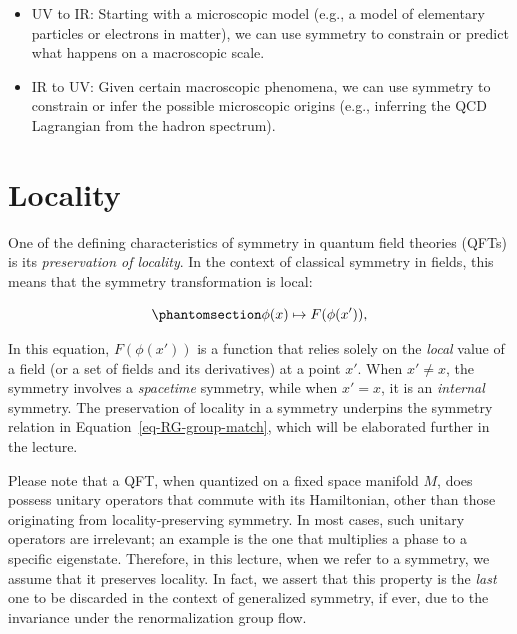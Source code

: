 \documentclass[
  letterpaper,
  DIV=11,
  numbers=noendperiod]{scrreport}
\providecommand{\tightlist}{%
  \setlength{\itemsep}{0pt}\setlength{\parskip}{0pt}}\usepackage{longtable,booktabs,array}
\begin{document}
\begin{itemize}
\tightlist
\item
  UV to IR: Starting with a microscopic model (e.g., a model of
  elementary particles or electrons in matter), we can use symmetry to
  constrain or predict what happens on a macroscopic scale.
\item
  IR to UV: Given certain macroscopic phenomena, we can use symmetry to
  constrain or infer the possible microscopic origins (e.g., inferring
  the QCD Lagrangian from the hadron spectrum).
\end{itemize}

\section{Locality}\label{locality}

One of the defining characteristics of symmetry in quantum field
theories (QFTs) is its \emph{preservation of locality}. In the context
of classical symmetry in fields, this means that the symmetry
transformation is local:

\begin{equation}\phantomsection\label{eq-field-transform}{
\phi(x) \mapsto F(\phi(x')),
}\end{equation}

In this equation, \(F(\phi(x'))\) is a function that relies solely on
the \emph{local} value of a field (or a set of fields and its
derivatives) at a point \(x'\). When \(x'\neq x\), the symmetry involves
a \emph{spacetime} symmetry, while when \(x'=x\), it is an
\emph{internal} symmetry. The preservation of locality in a symmetry
underpins the symmetry relation in Equation~\ref{eq-RG-group-match},
which will be elaborated further in the lecture.

\begin{tcolorbox}[enhanced jigsaw, opacityback=0, opacitybacktitle=0.6, leftrule=.75mm, arc=.35mm, coltitle=black, breakable, colframe=quarto-callout-note-color-frame, titlerule=0mm, colback=white, bottomrule=.15mm, left=2mm, colbacktitle=quarto-callout-note-color!10!white, toptitle=1mm, bottomtitle=1mm, title=\textcolor{quarto-callout-note-color}{\faInfo}\hspace{0.5em}{Note}, rightrule=.15mm, toprule=.15mm]

Please note that a QFT, when quantized on a fixed space manifold \(M\),
does possess unitary operators that commute with its Hamiltonian, other
than those originating from locality-preserving symmetry. In most cases,
such unitary operators are irrelevant; an example is the one that
multiplies a phase to a specific eigenstate. Therefore, in this lecture,
when we refer to a symmetry, we assume that it preserves locality. In
fact, we assert that this property is the \emph{last} one to be
discarded in the context of generalized symmetry, if ever, due to the
invariance under the renormalization group flow. \footnotemark{}

\end{tcolorbox}
\end{document}
